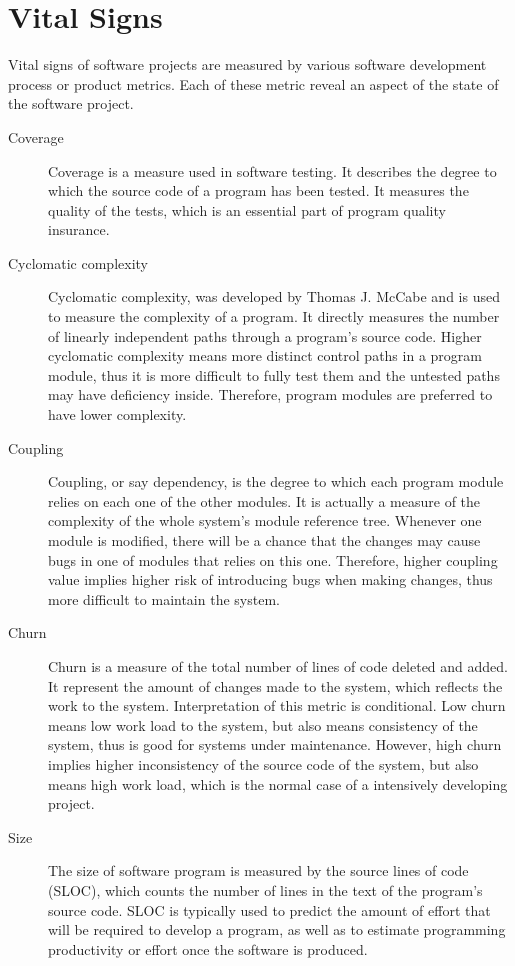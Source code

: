\section{Vital Signs}
Vital signs of software projects are measured by various software development process or product metrics. Each of these metric reveal an aspect of the state of the software project.
\begin{description}
\item[Coverage] 
Coverage is a measure used in software testing. It describes the degree to which the source code of a program has been tested. It measures the quality of the tests, which is an essential part of program quality insurance.
\item[Cyclomatic complexity] 
Cyclomatic complexity, was developed by Thomas J. McCabe and is used to measure the complexity of a program. It directly measures the number of linearly independent paths through a program's source code.\cite{mccabe:complexity} Higher cyclomatic complexity means more distinct control paths in a program module, thus it is more difficult to fully test them and the untested paths may have deficiency inside. Therefore, program modules are preferred to have lower complexity.
\item[Coupling] 
Coupling, or say dependency, is the degree to which each program module relies on each one of the other modules.\cite{wiki:coupling} It is actually a measure of the complexity of the whole system's module reference tree. Whenever one module is modified, there will be a chance that the changes may cause bugs in one of modules that relies on this one. Therefore, higher coupling value implies higher risk of introducing bugs when making changes, thus more difficult to maintain the system.
\item[Churn] 
Churn is a measure of the total number of lines of code deleted and added. It represent the amount of changes made to the system, which reflects the work to the system. Interpretation of this metric is conditional. Low churn means low work load to the system, but also means consistency of the system, thus is good for systems under maintenance. However, high churn implies higher inconsistency of the source code of the system, but also means high work load, which is the normal case of a intensively developing project.
\item[Size] 
The size of software program is measured by the source lines of code (SLOC), which counts the number of lines in the text of the program's source code. SLOC is typically used to predict the amount of effort that will be required to develop a program, as well as to estimate programming productivity or effort once the software is produced.

\end{description}
